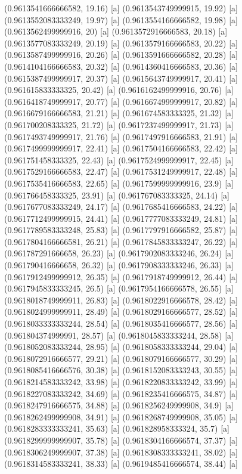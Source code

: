 {{{(0.9613541666666582, 19.16) [a] 
(0.9613543749999915, 19.92) [a] 
(0.9613552083333249, 19.97) [a] 
(0.9613554166666582, 19.98) [a] 
(0.9613562499999916, 20) [a] 
(0.9613572916666583, 20.18) [a] 
(0.9613577083333249, 20.19) [a] 
(0.9613579166666583, 20.22) [a] 
(0.9613587499999916, 20.26) [a] 
(0.9613591666666582, 20.28) [a] 
(0.9614104166666583, 20.32) [a] 
(0.9614360416666583, 20.36) [a] 
(0.9615387499999917, 20.37) [a] 
(0.9615643749999917, 20.41) [a] 
(0.961615833333325, 20.42) [a] 
(0.9616162499999916, 20.76) [a] 
(0.9616418749999917, 20.77) [a] 
(0.9616674999999917, 20.82) [a] 
(0.9616679166666583, 21.21) [a] 
(0.961674583333325, 21.32) [a] 
(0.961700208333325, 21.72) [a] 
(0.9617237499999917, 21.73) [a] 
(0.9617493749999917, 21.76) [a] 
(0.9617497916666583, 21.91) [a] 
(0.9617499999999917, 22.41) [a] 
(0.9617504166666583, 22.42) [a] 
(0.961751458333325, 22.43) [a] 
(0.9617524999999917, 22.45) [a] 
(0.9617529166666583, 22.47) [a] 
(0.9617531249999917, 22.48) [a] 
(0.9617535416666583, 22.65) [a] 
(0.9617599999999916, 23.9) [a] 
(0.961766458333325, 23.91) [a] 
(0.961767083333325, 24.14) [a] 
(0.9617677083333249, 24.17) [a] 
(0.9617685416666583, 24.22) [a] 
(0.9617712499999915, 24.41) [a] 
(0.9617777083333249, 24.81) [a] 
(0.9617789583333248, 25.83) [a] 
(0.9617797916666582, 25.87) [a] 
(0.9617804166666581, 26.21) [a] 
(0.9617845833333247, 26.22) [a] 
(0.961787291666658, 26.23) [a] 
(0.9617902083333246, 26.24) [a] 
(0.961790416666658, 26.32) [a] 
(0.9617908333333246, 26.33) [a] 
(0.9617912499999912, 26.35) [a] 
(0.9617918749999912, 26.44) [a] 
(0.9617945833333245, 26.5) [a] 
(0.9617954166666578, 26.55) [a] 
(0.9618018749999911, 26.83) [a] 
(0.9618022916666578, 28.42) [a] 
(0.9618024999999911, 28.49) [a] 
(0.9618029166666577, 28.52) [a] 
(0.9618033333333244, 28.54) [a] 
(0.9618035416666577, 28.56) [a] 
(0.961804374999991, 28.57) [a] 
(0.9618045833333244, 28.58) [a] 
(0.9618052083333244, 28.95) [a] 
(0.9618058333333244, 29.04) [a] 
(0.9618072916666577, 29.21) [a] 
(0.9618079166666577, 30.29) [a] 
(0.9618085416666576, 30.38) [a] 
(0.9618152083333243, 30.55) [a] 
(0.9618214583333242, 33.98) [a] 
(0.9618220833333242, 33.99) [a] 
(0.9618227083333242, 34.69) [a] 
(0.9618235416666575, 34.87) [a] 
(0.9618247916666575, 34.88) [a] 
(0.9618256249999908, 34.9) [a] 
(0.9618262499999908, 34.91) [a] 
(0.9618268749999908, 35.05) [a] 
(0.9618283333333241, 35.63) [a] 
(0.961828958333324, 35.7) [a] 
(0.9618299999999907, 35.78) [a] 
(0.9618304166666574, 37.37) [a] 
(0.9618306249999907, 37.38) [a] 
(0.9618308333333241, 38.02) [a] 
(0.9618314583333241, 38.33) [a] 
(0.9619485416666574, 38.44) [a] 
}}}
